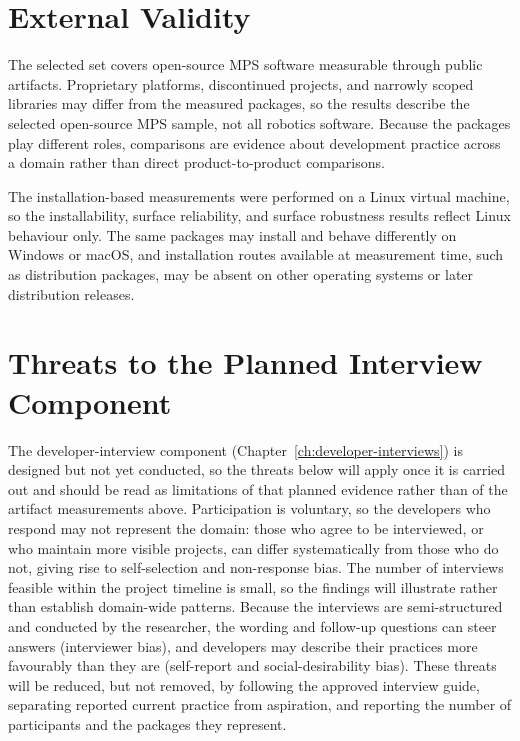 \section{External Validity}
\label{sec:threat-external-validity}

The selected set covers open-source MPS software measurable through public artifacts. Proprietary platforms, discontinued projects, and narrowly scoped libraries may differ from the measured packages, so the results describe the selected open-source MPS sample, not all robotics software. Because the packages play different roles, comparisons are evidence about development practice across a domain rather than direct product-to-product comparisons.

The installation-based measurements were performed on a Linux virtual machine, so the installability, surface reliability, and surface robustness results reflect Linux behaviour only. The same packages may install and behave differently on Windows or macOS, and installation routes available at measurement time, such as distribution packages, may be absent on other operating systems or later distribution releases.

\section{Threats to the Planned Interview Component}
\label{sec:threat-interviews}

The developer-interview component (Chapter~\ref{ch:developer-interviews}) is designed but not yet conducted, so the threats below will apply once it is carried out and should be read as limitations of that planned evidence rather than of the artifact measurements above. Participation is voluntary, so the developers who respond may not represent the domain: those who agree to be interviewed, or who maintain more visible projects, can differ systematically from those who do not, giving rise to self-selection and non-response bias. The number of interviews feasible within the project timeline is small, so the findings will illustrate rather than establish domain-wide patterns. Because the interviews are semi-structured and conducted by the researcher, the wording and follow-up questions can steer answers (interviewer bias), and developers may describe their practices more favourably than they are (self-report and social-desirability bias). These threats will be reduced, but not removed, by following the approved interview guide, separating reported current practice from aspiration, and reporting the number of participants and the packages they represent.
